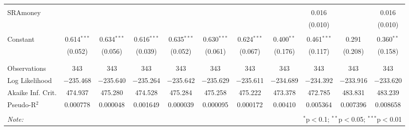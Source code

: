 \documentclass[12pt]{article}
\begin{document}
{\begin{table}[!htbp]
\begin{adjustbox}{width=\textwidth}
\begin{tabular}{@{\extracolsep{5pt}}lcccccccccc}
  & & & & & & & & & & \\ 
 SRAmoney &  &  &  &  &  &  &  & 0.016 &  & 0.016 \\ 
  &  &  &  &  &  &  &  & (0.010) &  & (0.010) \\ 
  & & & & & & & & & & \\ 
 Constant & 0.614$^{***}$ & 0.634$^{***}$ & 0.616$^{***}$ & 0.635$^{***}$ & 0.630$^{***}$ & 0.624$^{***}$ & 0.400$^{**}$ & 0.461$^{***}$ & 0.291 & 0.360$^{**}$ \\ 
  & (0.052) & (0.056) & (0.039) & (0.052) & (0.061) & (0.067) & (0.176) & (0.117) & (0.208) & (0.158) \\ 
  & & & & & & & & & & \\ 
\hline \\[-1.8ex] 
Observations & 343 & 343 & 343 & 343 & 343 & 343 & 343 & 343 & 343 & 343 \\ 
Log Likelihood & $-$235.468 & $-$235.640 & $-$235.264 & $-$235.642 & $-$235.629 & $-$235.611 & $-$234.689 & $-$234.392 & $-$233.916 & $-$233.620 \\ 
Akaike Inf. Crit. & 474.937 & 475.280 & 474.528 & 475.284 & 475.258 & 475.222 & 473.378 & 472.785 & 483.831 & 483.239 \\ 
Pseudo-R$^{2}$ & 0.000778 & 0.000048 & 0.001649 & 0.000039 & 0.000095 & 0.000172 & 0.00410 & 0.005364 & 0.007396 & 0.008658\\
\hline 
\hline \\[-1.8ex] 
\textit{Note:}  & \multicolumn{10}{r}{$^{*}$p$<$0.1; $^{**}$p$<$0.05; $^{***}$p$<$0.01} \\ 
\end{tabular} 
\end{adjustbox}

\end{table}}
\end{document}
